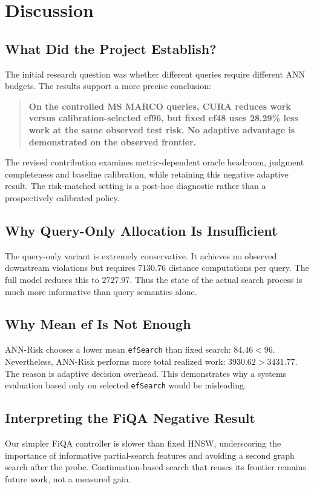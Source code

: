 \documentclass[10pt,twocolumn]{article}
\newcommand{\ef}{\texttt{efSearch}}
\begin{document}
\section{Discussion}
\label{sec:discussion}
\subsection{What Did the Project Establish?}
The initial research question was whether different queries require different ANN budgets. The results support a more precise conclusion:
\begin{quote}
\textbf{On the controlled MS MARCO queries, CURA reduces work versus calibration-selected ef96, but fixed ef48 uses 28.29\% less work at the same observed test risk. No adaptive advantage is demonstrated on the observed frontier.}
\end{quote}
The revised contribution examines metric-dependent oracle headroom, judgment completeness and baseline calibration, while retaining this negative adaptive result. The risk-matched setting is a post-hoc diagnostic rather than a prospectively calibrated policy.

\subsection{Why Query-Only Allocation Is Insufficient}
The query-only variant is extremely conservative. It achieves no observed downstream violations but requires $7130.76$ distance computations per query. The full model reduces this to $2727.97$. Thus the state of the actual search process is much more informative than query semantics alone.

\subsection{Why Mean ef Is Not Enough}
ANN-Risk chooses a lower mean \ef{} than fixed search: $84.46<96$. Nevertheless, ANN-Risk performs more total realized work: $3930.62>3431.77$. The reason is adaptive decision overhead. This demonstrates why a systems evaluation based only on selected \ef{} would be misleading.

\subsection{Interpreting the FiQA Negative Result}
Our simpler FiQA controller is slower than fixed HNSW, underscoring the importance of informative partial-search features and avoiding a second graph search after the probe. Continuation-based search that reuses its frontier remains future work, not a measured gain.
\end{document}
